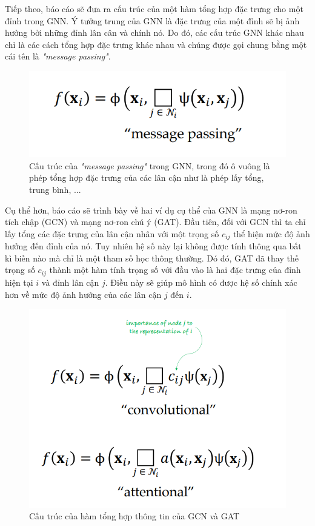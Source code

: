 \vspace{-0.5cm}

Tiếp theo, báo cáo sẽ đưa ra cấu trúc của một hàm tổng hợp đặc trưng cho một đỉnh trong GNN. Ý tưởng trung của GNN là đặc trưng của một đỉnh sẽ bị ảnh hưởng bởi những đỉnh lân cân và chính nó. Do đó, các cấu trúc GNN khác nhau chỉ là các cách tổng hợp đặc trưng khác nhau và chúng được gọi chung bằng một cái tên là \textit{"message passing"}. 
\begin{figure}[H]
    \centering
    \captionsetup{justification=centering}
    \includegraphics[width=0.7\linewidth]{Images/GDL/graph/message_passing.png}
    \caption{Cấu trúc của \textit{"message passing"} trong GNN, trong đó ô vuông là phép tổng hợp đặc trưng của các lân cận như là phép lấy tổng, trung bình, ...\cite{geometricdeep2022}}
\end{figure}

\vspace{-0.5cm}

Cụ thể hơn, báo cáo sẽ trình bày về hai ví dụ cụ thể của GNN là mạng nơ-ron tích chập (GCN) và mạng nơ-ron chú ý (GAT). Đầu tiên, đối với GCN thì ta chỉ lấy tổng các đặc trưng của lân cận nhân với một trọng số $c_{ij}$ thể hiện mức độ ảnh hưởng đến đỉnh của nó\cite{gcn_paper}. Tuy nhiên hệ số này lại không được tính thông qua bất kì biến nào mà chỉ là một tham số học thông thường. Dó đó, GAT \cite{gat_paper} đã thay thế trọng số $c_{ij}$ thành một hàm tính trọng số với đầu vào là hai đặc trưng của đỉnh hiện tại  $i$ và đỉnh lân cận $j$. Điều này sẽ giúp mô hình có được hệ số chính xác hơn về mức độ ảnh hưởng của các lân cận $j$ đến $i$.

\begin{figure}[H]
    \centering
    \captionsetup{justification=centering}
    \includegraphics[width=0.7\linewidth]{Images/GDL/graph/gcn_gat.png}
    \caption{Cấu trúc của hàm tổng hợp thông tin của GCN và GAT\cite{geometricdeep2022}}
\end{figure}

